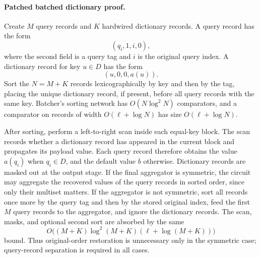%
%
%
\paragraph{Patched batched dictionary proof.}
Create \(M\) query records and \(K\) hardwired dictionary records.  A query
record has the form
\[
  (q_i,1,i,0),
\]
where the second field is a query tag and \(i\) is the original query index.  A
dictionary record for key \(u\in D\) has the form
\[
  (u,0,0,a(u)).
\]
Sort the \(N=M+K\) records lexicographically by key and then by the tag, placing
the unique dictionary record, if present, before all query records with the same
key.  Batcher's sorting network has \(O(N\log^2 N)\) comparators, and a
comparator on records of width \(O(\ell+\log N)\) has size
\(O(\ell+\log N)\).

After sorting, perform a left-to-right scan inside each equal-key block.  The
scan records whether a dictionary record has appeared in the current block and
propagates its payload value.  Each query record therefore obtains the value
\(a(q_i)\) when \(q_i\in D\), and the default value \(b\) otherwise.  Dictionary
records are masked out at the output stage.  If the final aggregator is
symmetric, the circuit may aggregate the recovered values of the query records
in sorted order, since only their multiset matters.  If the aggregator is not
symmetric, sort all records once more by the query tag and then by the stored
original index, feed the first \(M\) query records to the aggregator, and ignore
the dictionary records.  The scan, masks, and optional second sort are absorbed
by the same
\[
  O\bigl((M+K)\log^2(M+K)(\ell+\log(M+K))\bigr)
\]
bound.  Thus original-order restoration is unnecessary only in the symmetric
case; query-record separation is required in all cases.
